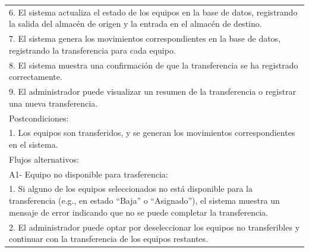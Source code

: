 \documentclass[stu, 12pt, letterpaper, donotrepeattitle, floatsintext, natbib]{apa7}
\begin{document}
\begin{longtable}{@{} p{16.5cm} @{}}
    6. El sistema actualiza el estado de los equipos en la base de datos, registrando la salida del almacén de origen y la entrada en el almacén de destino.                                                                               \\
    7. El sistema genera los movimientos correspondientes en la base de datos, registrando la transferencia para cada equipo.                                                                                                              \\
    8. El sistema muestra una confirmación de que la transferencia se ha registrado correctamente.                                                                                                                                         \\
    9. El administrador puede visualizar un resumen de la transferencia o registrar una nueva transferencia.                                                                                                                               \\ \midrule
    Postcondiciones:                                                                                                                                                                                                                       \\
    1. Los equipos son transferidos, y se generan los movimientos correspondientes en el sistema.                                                                                                                                          \\ \midrule
    Flujos alternativos:                                                                                                                                                                                                                   \\
    A1- Equipo no disponible para trasferencia:                                                                                                                                                                                            \\
    \hspace{1cm}1. Si alguno de los equipos seleccionados no está disponible para la transferencia (e.g., en estado ``Baja'' o ``Asignado''), el sistema muestra un mensaje de error indicando que no se puede completar la transferencia. \\
    \hspace{1cm}2. El administrador puede optar por deseleccionar los equipos no transferibles y continuar con la transferencia de los equipos restantes.                                                                                  \\

\end{longtable}
\end{document}

